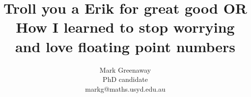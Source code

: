 \documentclass{beamer}
\title{Troll you a Erik for great good OR How I learned to stop worrying and love floating point numbers}
\author{Mark Greenaway \\ PhD candidate \\ markg@maths.usyd.edu.au}
\begin{document}
\begin{frame}
\maketitle
\end{frame}




\end{document}
